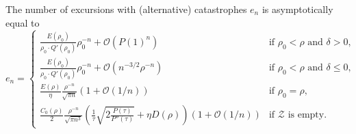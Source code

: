 \begin{theorem}
\label{thm:asym_excursions}
  The number of excursions with (alternative) catastrophes $e_n$ is asymptotically equal to
  \begin{equation*}
    e_n = 
    \begin{cases}
      \frac{E(\rho_0)}{\rho_0 \cdot Q'(\rho_0)} \rho_0^{-n} + 
      \mathcal{O}(P(1)^n) & 
      \text{if $\rho_0 < \rho$ and $\delta > 0$}, \\[8pt]
      \frac{E(\rho_0)}{\rho_0 \cdot Q'(\rho_0)} \rho_0^{-n} + 
      \mathcal{O}(n^{-3/2}\rho^{-n}) & 
      \text{if $\rho_0 < \rho$ and $\delta \leq 0$}, \\[8pt]
      \frac{E(\rho)}{\eta}\frac{\rho^{-n}}{\sqrt{\pi n}}
      \left(1 + \mathcal{O}\left(1/n\right)\right) & 
      \text{if $\rho_0 = \rho$}, \\[8pt]
      \frac{C_0(\rho)}{2}\frac{\rho^{-n}}{\sqrt{\pi n^3}}
      \left(\frac{1}{\tau}\sqrt{2\frac{P(\tau)}{P''(\tau)}} + \eta D(\rho)\right)
      \left(1 + \mathcal{O}\left(1/n\right)\right) & 
      \text{if $\mathcal{Z}$ is empty.}
    \end{cases}
  \end{equation*}
\end{theorem}


